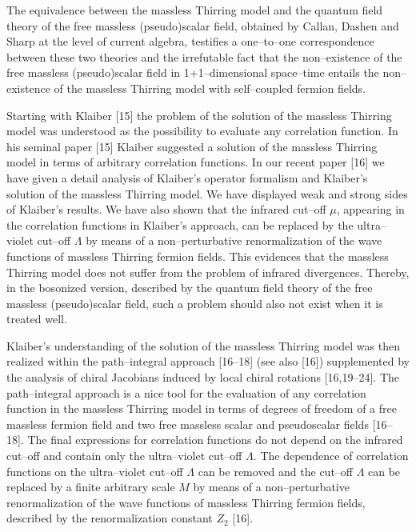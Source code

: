 \documentclass[a4paper,12pt] {article}
\begin{document}
The equivalence between the massless Thirring model and the quantum
field theory of the free massless (pseudo)scalar field, obtained by
Callan, Dashen and Sharp at the level of current algebra, testifies a
one--to--one correspondence between these two theories and the
irrefutable fact that the non--existence of the free massless
(pseudo)scalar field in 1+1--dimensional space--time entails the
non--existence of the massless Thirring model with self--coupled
fermion fields. 

Starting with Klaiber [15] the problem of the solution of the massless
Thirring model was understood as the possibility to evaluate any
correlation function. In his seminal paper [15] Klaiber suggested a
solution of the massless Thirring model in terms of arbitrary
correlation functions. In our recent paper [16] we have given a detail
analysis of Klaiber's operator formalism and Klaiber's solution of the
massless Thirring model. We have displayed weak and strong sides of
Klaiber's results. We have also shown that the infrared cut--off
$\mu$, appearing in the correlation functions in Klaiber's approach,
can be replaced by the ultra--violet cut--off $\Lambda$ by means of a
non--perturbative renormalization of the wave functions of massless
Thirring fermion fields. This evidences that the massless Thirring
model does not suffer from the problem of infrared
divergences. Thereby, in the bosonized version, described by the
quantum field theory of the free massless (pseudo)scalar field, such a
problem should also not exist when it is treated well.

Klaiber's understanding of the solution of the massless Thirring model
was then realized within the path--integral approach [16--18] (see
also [16]) supplemented by the analysis of chiral Jacobians induced by
local chiral rotations [16,19--24]. The path--integral approach is a
nice tool for the evaluation of any correlation function in the
massless Thirring model in terms of degrees of freedom of a free
massless fermion field and two free massless scalar and pseudoscalar
fields [16--18]. The final expressions for correlation functions do
not depend on the infrared cut--off and contain only the ultra--violet
cut--off $\Lambda$. The dependence of correlation functions on the
ultra--violet cut--off $\Lambda$ can be removed and the cut--off
$\Lambda $ can be replaced by a finite arbitrary scale $M$ by means of
a non--perturbative renormalization of the wave functions of massless
Thirring fermion fields, described by the renormalization constant
$Z_2$ [16].
\end{document}
